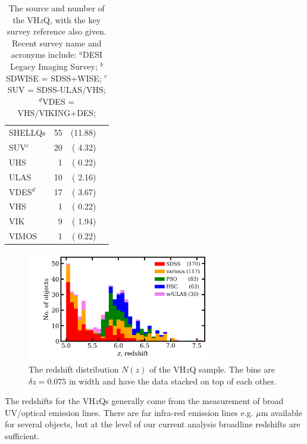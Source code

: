 \documentclass[usenatbib]{mnras}
\begin{document}
\begin{table}
\begin{tabular}{l r r l}
  SHELLQs         &    55    &   (11.88)  &  \citet{Matsuoka2016}     \\  
  SUV$^{c}$       &   20     &    ( 4.32)  & \citet{YangJ2017} \\
  UHS               &    1      &  ( 0.22)     &  \citet{WangF2017} \\
  ULAS               &   10   &   ( 2.16)     & \citet{Lawrence2007} \\
  VDES$^{d}$       &   17  &    ( 3.67)     &  \citet{Reed2017} \\
  VHS                 &     1  &     ( 0.22)    & \citet{WangF2018b} \\
  VIK                 &     9    &  ( 1.94)    &  \citet{Edge2013} \\
  VIMOS           &    1      &  ( 0.22)     &   \citet{LeFevre2003} \\
\hline  \hline
\end{tabular}
\caption{The source and number of the VH$z$Q, with the key survey reference also given. 
  Recent survey name and acronyms include: 
  $^{a}$DESI Legacy Imaging Survey; 
  $^{b}$SDWISE = SDSS+WISE; 
  $^{c}$SUV  = SDSS-ULAS/VHS; 
  $^{d}$VDES = VHS/VIKING+DES; 
}
      \label{tab:surveys}
\end{table}

\begin{figure}
  \includegraphics[width=8.0cm, clip, trim=10mm 0mm 0mm 0mm]
  {../Nofz/Nofz_0pnt075bins_20181211.png}
  \centering
  \vspace{-12pt}
  \caption[]
  {The redshift distribution $N(z)$ of the VH$z$Q sample. 
    The bins are $\delta z=0.075$ in width and have the data 
    stacked on top of each other.}
  \label{fig:Nofz}
\end{figure}

The redshifts for the VH$z$Qs generally come from the measurement of
broad UV/optical emission lines. There are far infra-red emission
lines e.g.  $\mu$m available for several objects, but at the
level of our current analysis broadline redshifts are sufficient.
\end{document}
